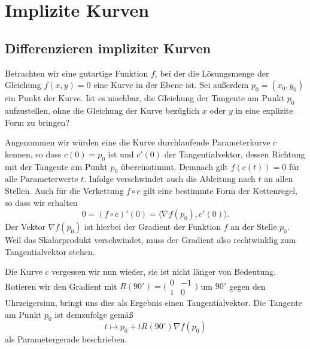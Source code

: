 \section{Implizite Kurven}
\subsection{Differenzieren impliziter Kurven}

Betrachten wir eine gutartige Funktion $f$, bei der die Lösungsmenge
der Gleichung $f(x,y)=0$ eine Kurve in der Ebene ist. Sei außerdem
$p_0=(x_0,y_0)$ ein Punkt der Kurve. Ist es machbar, die Gleichung
der Tangente am Punkt $p_0$ aufzustellen, ohne die Gleichung der Kurve
bezüglich $x$ oder $y$ in eine explizite Form zu bringen?

Angenommen wir würden eine die Kurve durchlaufende Parameterkurve
$c$ kennen, so dass $c(0)=p_0$ ist und $c'(0)$ der Tangentialvektor,
dessen Richtung mit der Tangente am Punkt $p_0$ übereinstimmt.
Demnach gilt $f(c(t))=0$ für alle Parameterwerte $t$. Infolge
verschwindet auch die Ableitung nach $t$ an allen Stellen. Auch
für die Verkettung $f\circ c$ gilt eine bestimmte Form der
Kettenregel, so dass wir erhalten%
\[0 = (f\circ c)'(0) = \langle\nabla f(p_0), c'(0)\rangle.\]
Der Vektor $\nabla f(p_0)$ ist hierbei der Gradient der Funktion
$f$ an der Stelle $p_0$. Weil das Skalarprodukt verschwindet,
muss der Gradient also rechtwinklig zum Tangentialvektor stehen.

Die Kurve $c$ vergessen wir nun wieder, sie ist nicht länger
von Bedeutung. Rotieren wir den Gradient mit
$R(90^\circ)=\big(\begin{smallmatrix}0 & -1\\ 1 & 0\end{smallmatrix}\big)$
um $90^\circ$ gegen den Uhrzeigersinn, bringt uns dies als
Ergebnis einen Tangentialvektor. Die Tangente am Punkt $p_0$ ist
demzufolge gemäß%
\[t\mapsto p_0 + tR(90^\circ)\nabla f(p_0)\]
als Parametergerade beschrieben.

